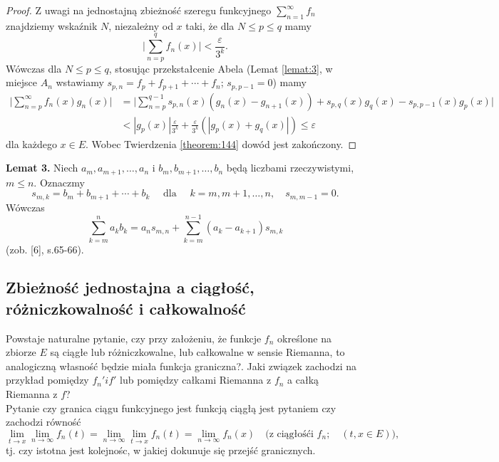 \documentclass[leqno]{article}
\begin{document}
\begin{justify}
\begin{proof}
    Z uwagi na jednostajną zbieżność szeregu funkcyjnego $\sum\limits_{n=1}^{\infty}f_n$ znajdziemy wskaźnik $N$, niezależny od $x$ taki, że dla $N \leqslant p \leqslant q$ mamy
    \[
        \Bigg|\sum_{n=p}^{q}f_n(x)\Bigg| < \frac{\varepsilon}{3^k}.
    \]
    Wówczas dla $N \leqslant p \leqslant q$, stosując przekstałcenie Abela (Lemat \ref{lemat:3}, w miejsce $A_n$ wstawiamy $s_{p,n} = f_p + f_{p+1} + \cdots + f_n$; $s_{p,{p-1}} = 0$) mamy
    \begin{align*}
        \Bigg|\sum_{n=p}^{\infty}f_n(x)g_n(x)\Bigg| &= \Bigg|\sum_{n=p}^{q-1}s_{p,n}(x)(g_n(x) - g_{n+1}(x)) + s_{p, q}(x)g_q(x) - s_{p, p-1}(x)g_p(x) \Bigg| \\
                                                    &< |g_p(x)|\frac{\varepsilon}{3^k} + \frac{\varepsilon}{3^k}(|g_p(x) + g_q(x)|) \leqslant \varepsilon
    \end{align*}
    dla każdego $x \in E$. Wobec Twierdzenia \ref{theorem:144} dowód jest zakończony.
\end{proof}

\noindent
\textbf{Lemat 3.}\label{lemat:3}
Niech $a_m, a_{m+1}, \ldots, a_n$ i $b_m, b_{m+1}, \ldots, b_n$ będą liczbami rzeczywistymi, $m \leqslant n$. Oznaczmy
\[
    s_{m,k} = b_m + b_{m+1} + \cdots + b_k \quad \text{ dla } \quad k = m, m+1, \ldots, n, \quad s_{m,{m-1}} = 0. 
\]
Wówczas
\[
    \sum_{k=m}^{n}a_k b_k = a_n s_{m,n} + \sum_{k=m}^{n-1}(a_k - a_{k+1})s_{m, k}
\]
(zob. [6], s.65-66).

\newpage
\subsection{Zbieżność jednostajna a ciągłość, różniczkowalność i całkowalność}

Powstaje naturalne pytanie, czy przy założeniu, że funkcje $f_n$ określone na zbiorze $E$ są
ciągłe lub różniczkowalne, lub całkowalne w sensie Riemanna, to analogiczną własność będzie miała funkcja graniczna?.
Jaki związek zachodzi na przykład pomiędzy $f_n' i f'$ lub pomiędzy całkami Riemanna z $f_n$ a całką Riemanna z $f$? \\
Pytanie czy granica ciągu funkcyjnego jest funkcją ciągłą jest pytaniem czy zachodzi równość 
\[
    \lim\limits_{t \to x} \lim\limits_{n \to \infty}f_n(t) = \lim\limits_{n \to \infty}\lim\limits_{t \to x}f_n(t) = \lim\limits_{n \to \infty}f_n(x) 
    \quad \text{(z ciągłośći } f_n; \quad (t, x \in E) \text{)},
\] 
tj. czy istotna jest kolejnośc, w jakiej dokunuje się przejść granicznych.


\end{justify}
\end{document}
